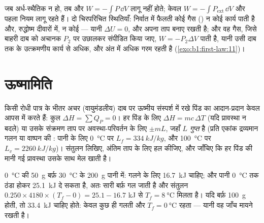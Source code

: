 \begin{remark}\label{rem:b1:first-law:irreversible}
जब  अर्ध-स्थैतिक न हो, तब  और $W =
-\int P\,\dd V$ लागू नहीं होते; केवल $W = -\int P_{\mathrm{ext}}\,\dd V$ और
पहला नियम लागू रहते हैं। दो चिरपरिचित स्थितियाँ: निर्वात में फैलती कोई गैस
() न कोई कार्य पाती है और, रुद्धोष्म दीवारों में, न कोई 
--- यानी $\Delta U
= 0$, और  अपना ताप बनाए रखती है; और वह गैस, जिसे बाहरी दाब को
अचानक $P_2$ पर उछालकर संपीडित किया जाए, $W = -P_2\Delta V$ पाती है, यानी उसी
दाब तक के उत्क्रमणीय कार्य से अधिक, और अंत में अधिक गरम रहती है
(\cref{exo:b1:first-law:11})।
\end{remark}

\section{ऊष्मामिति}

\begin{method}[ऊष्मामितीय संतुलन]\label{met:b1:first-law:calorimetry}
किसी रोधी पात्र के भीतर अचर (वायुमंडलीय) दाब पर ऊष्मीय संस्पर्श में रखे
पिंड  का आदान-प्रदान केवल आपस में करते हैं: कुल
$\Delta H = \sum Q_P = 0$। हर पिंड के लिए $\Delta H = mc\,\Delta T$ (यदि
प्रावस्था न बदले) या उसके संक्रमण ताप पर अवस्था-परिवर्तन के लिए $\pm mL$,
जहाँ $L$ \emph{गुप्त } है (प्रति एकांक द्रव्यमान गलन या वाष्पन की
: पानी के लिए \qty{0}{\degreeCelsius} पर $L_f = \qty{334}{kJ/kg}$,
और \qty{100}{\degreeCelsius} पर $L_v =
\qty{2260}{kJ/kg}$)। संतुलन लिखिए, अंतिम
ताप के लिए हल कीजिए, और जाँचिए कि हर पिंड की मानी गई प्रावस्था उसके साथ
मेल खाती है।
\end{method}

\begin{example}[पानी में बर्फ़]\label{ex:b1:first-law:ice}
\qty{0}{\degreeCelsius} की \qty{50}{g} बर्फ़ \qty{30}{\degreeCelsius} के
\qty{200}{g} पानी में: गलने के लिए \qty{16.7}{kJ} चाहिए; और पानी
\qty{0}{\degreeCelsius} तक ठंडा होकर \qty{25.1}{kJ} दे सकता है, अतः सारी
बर्फ़ गल जाती है और संतुलन $0.250 \times 4180 \times (T_f - 0) = 25.1 - 16.7$ kJ
से $T_f = \qty{8}{\degreeCelsius}$ मिलता है। यदि बर्फ़ \qty{100}{g} होती, तो
\qty{33.4}{kJ} चाहिए होते: केवल कुछ ही गलती और $T_f = \qty{0}{\degreeCelsius}$
रहता --- यानी वह जाँच मायने रखती है।
\end{example}

